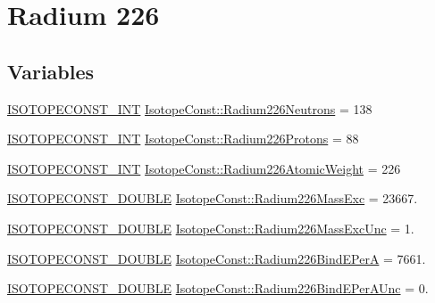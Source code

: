\hypertarget{group___isotope_const-_radium-_ra226}{}\section{Radium 226}
\label{group___isotope_const-_radium-_ra226}
\subsection*{Variables}
\begin{DoxyCompactItemize}
\item 
\mbox{\hyperlink{group___isotope_const-_macros_ga5f18360b3e99483a35c32d789e62621c}{I\+S\+O\+T\+O\+P\+E\+C\+O\+N\+S\+T\+\_\+\+I\+NT}} \mbox{\hyperlink{group___isotope_const-_radium-_ra226_ga417a7146f3197ec047fb3291f77a068b}{Isotope\+Const\+::\+Radium226\+Neutrons}} = 138
\item 
\mbox{\hyperlink{group___isotope_const-_macros_ga5f18360b3e99483a35c32d789e62621c}{I\+S\+O\+T\+O\+P\+E\+C\+O\+N\+S\+T\+\_\+\+I\+NT}} \mbox{\hyperlink{group___isotope_const-_radium-_ra226_ga61a91acc285b37e8273745176cf936fa}{Isotope\+Const\+::\+Radium226\+Protons}} = 88
\item 
\mbox{\hyperlink{group___isotope_const-_macros_ga5f18360b3e99483a35c32d789e62621c}{I\+S\+O\+T\+O\+P\+E\+C\+O\+N\+S\+T\+\_\+\+I\+NT}} \mbox{\hyperlink{group___isotope_const-_radium-_ra226_ga6788ab141d7a88581b6284d15e6d8497}{Isotope\+Const\+::\+Radium226\+Atomic\+Weight}} = 226
\item 
\mbox{\hyperlink{group___isotope_const-_macros_ga8f45a7272ce02c0b4c65c44636ed719a}{I\+S\+O\+T\+O\+P\+E\+C\+O\+N\+S\+T\+\_\+\+D\+O\+U\+B\+LE}} \mbox{\hyperlink{group___isotope_const-_radium-_ra226_ga999c698402d6535af074218b4e19cc66}{Isotope\+Const\+::\+Radium226\+Mass\+Exc}} = 23667.
\item 
\mbox{\hyperlink{group___isotope_const-_macros_ga8f45a7272ce02c0b4c65c44636ed719a}{I\+S\+O\+T\+O\+P\+E\+C\+O\+N\+S\+T\+\_\+\+D\+O\+U\+B\+LE}} \mbox{\hyperlink{group___isotope_const-_radium-_ra226_ga93c6959c64cc10cc6319dcc12ac78a2f}{Isotope\+Const\+::\+Radium226\+Mass\+Exc\+Unc}} = 1.
\item 
\mbox{\hyperlink{group___isotope_const-_macros_ga8f45a7272ce02c0b4c65c44636ed719a}{I\+S\+O\+T\+O\+P\+E\+C\+O\+N\+S\+T\+\_\+\+D\+O\+U\+B\+LE}} \mbox{\hyperlink{group___isotope_const-_radium-_ra226_gaedca8e6eeb898ed954f325cf51276d07}{Isotope\+Const\+::\+Radium226\+Bind\+E\+PerA}} = 7661.
\item 
\mbox{\hyperlink{group___isotope_const-_macros_ga8f45a7272ce02c0b4c65c44636ed719a}{I\+S\+O\+T\+O\+P\+E\+C\+O\+N\+S\+T\+\_\+\+D\+O\+U\+B\+LE}} \mbox{\hyperlink{group___isotope_const-_radium-_ra226_gaa059533ba2c1260658ad120322c684a1}{Isotope\+Const\+::\+Radium226\+Bind\+E\+Per\+A\+Unc}} = 0.

\end{DoxyCompactItemize}
